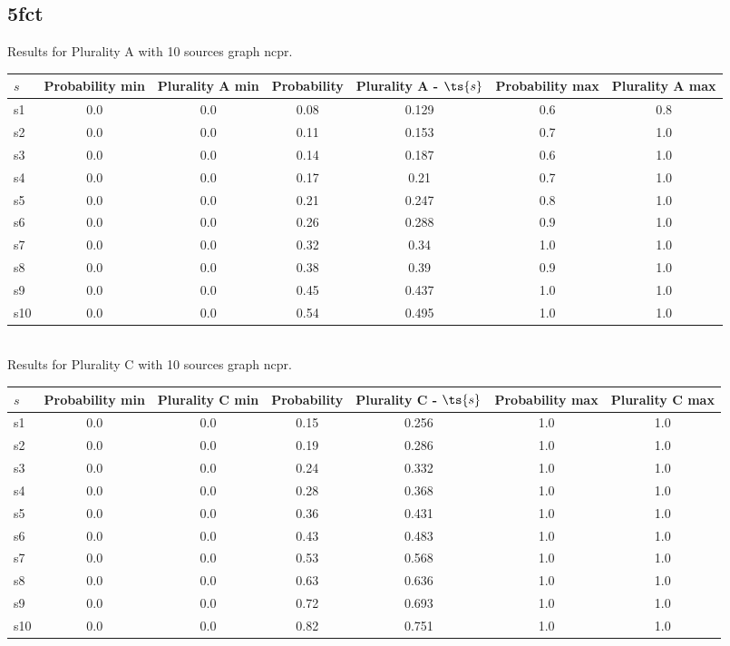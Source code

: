 \documentclass{article}
\begin{document}
\newpage

\subsection{5fct}

\noindent Results for Plurality A with 10 sources graph ncpr.

\noindent\begin{tabular}{|l|c|c|c|c|c|c|}
\hline
$s$& Probability min & Plurality A min & Probability & Plurality A - $\ts{s}$ & Probability max & Plurality A max\\
\hline
s1 &0.0 & 0.0 & 0.08 & 0.129 & 0.6 & 0.8\\
\hline
s2 &0.0 & 0.0 & 0.11 & 0.153 & 0.7 & 1.0\\
\hline
s3 &0.0 & 0.0 & 0.14 & 0.187 & 0.6 & 1.0\\
\hline
s4 &0.0 & 0.0 & 0.17 & 0.21 & 0.7 & 1.0\\
\hline
s5 &0.0 & 0.0 & 0.21 & 0.247 & 0.8 & 1.0\\
\hline
s6 &0.0 & 0.0 & 0.26 & 0.288 & 0.9 & 1.0\\
\hline
s7 &0.0 & 0.0 & 0.32 & 0.34 & 1.0 & 1.0\\
\hline
s8 &0.0 & 0.0 & 0.38 & 0.39 & 0.9 & 1.0\\
\hline
s9 &0.0 & 0.0 & 0.45 & 0.437 & 1.0 & 1.0\\
\hline
s10 &0.0 & 0.0 & 0.54 & 0.495 & 1.0 & 1.0\\
\hline
\end{tabular}\\

\noindent Results for Plurality C with 10 sources graph ncpr.

\noindent\begin{tabular}{|l|c|c|c|c|c|c|}
\hline
$s$& Probability min & Plurality C min & Probability & Plurality C - $\ts{s}$ & Probability max & Plurality C max\\
\hline
s1 &0.0 & 0.0 & 0.15 & 0.256 & 1.0 & 1.0\\
\hline
s2 &0.0 & 0.0 & 0.19 & 0.286 & 1.0 & 1.0\\
\hline
s3 &0.0 & 0.0 & 0.24 & 0.332 & 1.0 & 1.0\\
\hline
s4 &0.0 & 0.0 & 0.28 & 0.368 & 1.0 & 1.0\\
\hline
s5 &0.0 & 0.0 & 0.36 & 0.431 & 1.0 & 1.0\\
\hline
s6 &0.0 & 0.0 & 0.43 & 0.483 & 1.0 & 1.0\\
\hline
s7 &0.0 & 0.0 & 0.53 & 0.568 & 1.0 & 1.0\\
\hline
s8 &0.0 & 0.0 & 0.63 & 0.636 & 1.0 & 1.0\\
\hline
s9 &0.0 & 0.0 & 0.72 & 0.693 & 1.0 & 1.0\\
\hline
s10 &0.0 & 0.0 & 0.82 & 0.751 & 1.0 & 1.0\\
\hline
\end{tabular}\\
\end{document}
